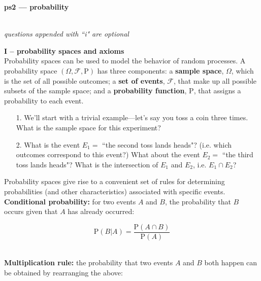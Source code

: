 \documentclass[10pt]{extarticle}
\renewcommand{\P}{\text{P}}
\begin{document}
\setlength{\parindent}{0pt}





{\bf \huge ps2 --- probability}

\hrulefill \\

{\it questions appended with ``i" are optional} \\

\hfill





{\bf \Large I -- probability spaces and axioms}  \\ 

Probability spaces can be used to model the behavior of random processes. A probability space $(\Omega, \mathcal F, \P)$ has three components: a {\bf sample space}, $\Omega$, which is the set of all possible outcomes; a {\bf set of events}, $\mathcal F$, that make up all possible subsets of the sample space; and a {\bf probability function}, $\P$, that assigns a probability to each event. 

\hfill 

\begin{itemize}
        
        \item[1.] We'll start with a trivial example---let's say you toss a coin three times.  What is the sample space for this experiment? \\

        \item[2.] What is the event $E_1 =$ ``the second toss lands heads"? (i.e. which outcomes correspond to this event?) What about the event $E_2 =$ ``the third toss lands heads"? What is the intersection of $E_1$ and $E_2$, i.e. $E_1 \cap E_2$?

\end{itemize} 

\hfill 

Probability spaces give rise to a convenient set of rules for determining probabilities (and other characteristics) associated with specific events. \\ 

{\bf Conditional probability:} for two events $A$ and $B$, the probability that $B$ occurs given that $A$ has already occurred:

$$\P(B|A) = \frac{\P(A \cap B)}{\P(A)}$$ \ 

{\bf Multiplication rule:} the probability that two events $A$ and $B$ both happen can be obtained by rearranging the above:
\end{document}
